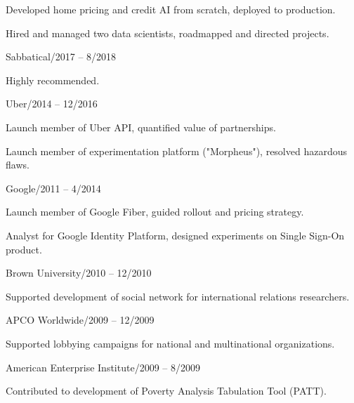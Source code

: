 \documentclass[12pt]{res}
\begin{document}
{\begin{resume}
\begin{list}{}{\leftmargin=1em}
{\begin{list}{}{\leftmargin=1em}
\begin{list}{-}{\leftmargin=1em}
\item Developed home pricing and credit AI from scratch, deployed to production.
\item Hired and managed two data scientists, roadmapped and directed projects.
\end{list}
\item Sabbatical/2017 -- 8/2018
\begin{list}{-}{\leftmargin=1em}
\item Highly recommended.
\end{list}
\item Uber/2014 -- 12/2016
\begin{list}{-}{\leftmargin=1em}
\item Launch member of Uber API, quantified value of partnerships.
\item Launch member of experimentation platform ("Morpheus"), resolved hazardous flaws.
\end{list}
\item Google/2011 -- 4/2014
\begin{list}{-}{\leftmargin=1em}
\item Launch member of Google Fiber, guided rollout and pricing strategy.
\item Analyst for Google Identity Platform, designed experiments on Single Sign-On product.
\end{list}
\item Brown University/2010 -- 12/2010
\begin{list}{-}{\leftmargin=1em}
\item Supported development of social network for international relations researchers.
\end{list}
\item APCO Worldwide/2009 -- 12/2009
\begin{list}{-}{\leftmargin=1em}
\item Supported lobbying campaigns for national and multinational organizations.
\end{list}
\item American Enterprise Institute/2009 -- 8/2009
\begin{list}{-}{\leftmargin=1em}
\item Contributed to development of Poverty Analysis Tabulation Tool (PATT).
\end{list}
\end{list}}
\item
\end{list}
\end{resume}
} %
\end{document}
